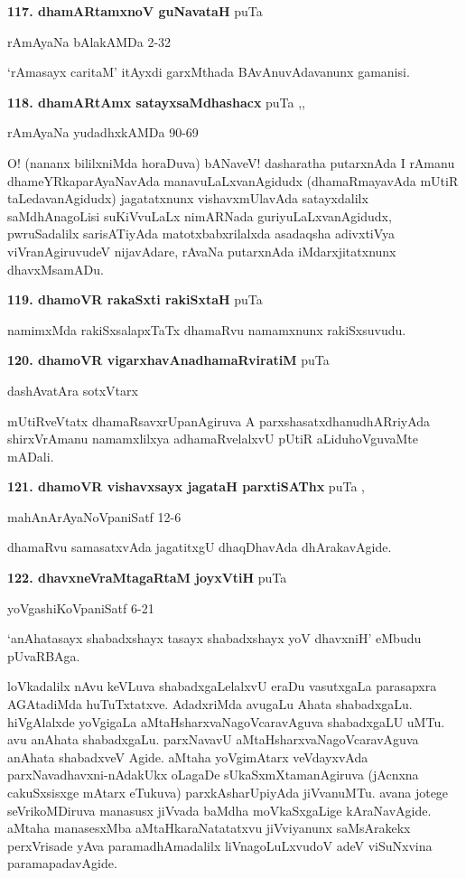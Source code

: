 \medskip
\noindent\textbf{117. dhamARtamxnoV guNavataH} \hfill puTa \pageref{165a}

\hfill rAmAyaNa bAlakAMDa 2-32

`rAmasayx caritaM' itAyxdi garxMthada BAvAnuvAdavanunx gamanisi.

\medskip
\noindent\textbf{118. dhamARtAmx satayxsaMdhashacx} \hfill puTa \pageref{165b},\pageref{207a},\pageref{250a}

\hfill rAmAyaNa yudadhxkAMDa 90-69

O! (nananx bililxniMda horaDuva) bANaveV! dasharatha putarxnAda I rAmanu dhameYRkaparAyaNavAda manavuLaLxvanAgidudx (dhamaRmayavAda mUtiR taLedavanAgidudx) jagatatxnunx vishavxmUlavAda satayxdalilx saMdhAnagoLisi suKiVvuLaLx nimARNada guriyuLaLxvanAgidudx, pwruSadalilx sarisATiyAda matotxbabxrilalxda asadaqsha adivxtiVya viVranAgiruvudeV nijavAdare, rAvaNa putarxnAda iMdarxjitatxnunx dhavxMsamADu.

\medskip
\noindent\textbf{119. dhamoVR rakaSxti rakiSxtaH} \hfill puTa \pageref{225}

namimxMda rakiSxsalapxTaTx dhamaRvu namamxnunx rakiSxsuvudu.

\medskip
\noindent\textbf{120. dhamoVR vigarxhavAnadhamaRviratiM} \hfill puTa \pageref{138}

\hfill dashAvatAra sotxVtarx

mUtiRveVtatx dhamaRsavxrUpanAgiruva A parxshasatxdhanudhARriyAda shirxVrAmanu namamxlilxya adhamaRvelalxvU pUtiR aLiduhoVguvaMte mADali.

\medskip
\noindent\textbf{121. dhamoVR vishavxsayx jagataH parxtiSAThx} \hfill puTa \pageref{182},\pageref{207b}

\hfill mahAnArAyaNoVpaniSatf 12-6

dhamaRvu samasatxvAda jagatitxgU dhaqDhavAda dhArakavAgide.

\medskip
\noindent\textbf{122. dhavxneVraMtagaRtaM  joyxVtiH} \hfill puTa \pageref{87}

\hfill yoVgashiKoVpaniSatf 6-21

`anAhatasayx shabadxshayx tasayx shabadxshayx yoV dhavxniH'  eMbudu pUvaRBAga.

loVkadalilx nAvu keVLuva shabadxgaLelalxvU eraDu vasutxgaLa parasapxra AGAtadiMda huTuTxtatxve. AdadxriMda avugaLu Ahata shabadxgaLu. hiVgAlalxde yoVgigaLa aMtaHsharxvaNagoVcaravAguva shabadxgaLU uMTu. avu anAhata shabadxgaLu. parxNavavU aMtaHsharxvaNagoVcaravAguva anAhata shabadxveV Agide. aMtaha yoVgimAtarx veVdayxvAda parxNavadhavxni-nAdakUkx oLagaDe sUkaSxmXtamanAgiruva (jAcnxna cakuSxsisxge mAtarx eTukuva) parxkAsharUpiyAda jiVvanuMTu. avana jotege seVrikoMDiruva manasusx jiVvada baMdha moVkaSxgaLige kAraNavAgide. aMtaha manasesxMba aMtaHkaraNatatatxvu jiVviyanunx saMsArakekx perxVrisade yAva paramadhAmadalilx liVnagoLuLxvudoV adeV viSuNxvina paramapadavAgide.

